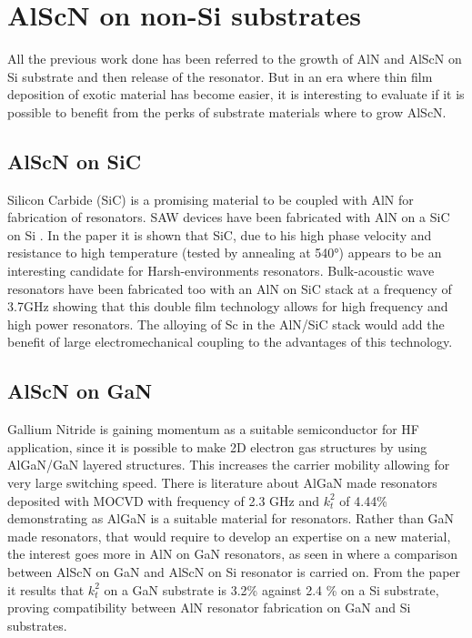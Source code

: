 \section{AlScN on non-Si substrates}
All the previous work done has been referred to the growth of AlN and AlScN on Si substrate and then release of the resonator. But in an era where thin film deposition of exotic material has become easier, it is interesting to evaluate if it is possible to benefit from the perks of substrate materials where to grow AlScN.

\subsection{AlScN on SiC}
\label{ssec:SiC}
Silicon Carbide (SiC) is a promising material to be coupled with AlN for fabrication of resonators. SAW devices have been fabricated with AlN on a SiC on Si \cite{lin_surface_2013}. In the paper it is shown that SiC, due to his high phase velocity and resistance to high temperature (tested by annealing at 540°) appears to be an interesting candidate for Harsh-environments resonators. Bulk-acoustic wave resonators have been fabricated too with an AlN on SiC stack \cite{shealy_low_2017} at a frequency of 3.7GHz showing that this double film technology allows for high frequency and high power resonators. The alloying of Sc in the AlN/SiC stack would add the benefit of large electromechanical coupling to the advantages of this technology.  


\subsection{AlScN on GaN}
Gallium Nitride is gaining momentum as a suitable semiconductor for HF application, since it is possible to make 2D electron gas structures by using AlGaN/GaN layered structures. This increases the carrier mobility allowing for very large switching speed. There is literature about AlGaN made resonators \cite{shealy_single_2016} deposited with MOCVD with frequency of 2.3 GHz and $ k_t^2 $ of 4.44\% demonstrating as AlGaN is a suitable material for resonators. Rather than GaN made resonators, that would require to develop an expertise on a new material, the interest goes more in AlN on GaN resonators, as seen in \cite{qamar_coupled_2019} where a comparison between AlScN on GaN and AlScN on Si resonator is carried on. From the paper it results that $ k_t^2 $ on a GaN substrate is 3.2\% against 2.4 \% on a Si substrate, proving compatibility between AlN resonator fabrication on GaN and Si substrates.

